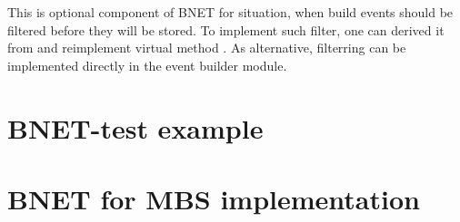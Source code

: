 This is optional component of BNET for situation, when build events should be filtered
before they will be stored. To implement such filter, 
one can derived it from  and reimplement virtual method
. As alternative, filterring can be implemented directly in the 
event builder module.  


  


\section{BNET-test example}


\section{BNET for MBS implementation}
